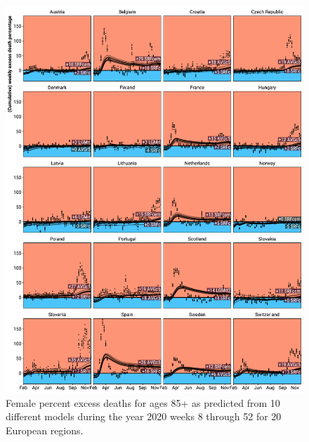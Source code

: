 \documentclass[12pt]{article}
\begin{document}
\begin{appendix}
\begin{figure}
\caption{
Female percent excess deaths for ages 85+ as predicted from 10 different models during the year 2020 weeks 8 through 52 for 20 European regions.}
\label{fig:excessf85plus}
\includegraphics{excess_female__85_inf_.pdf}
\end{figure}



\end{appendix}
\end{document}
